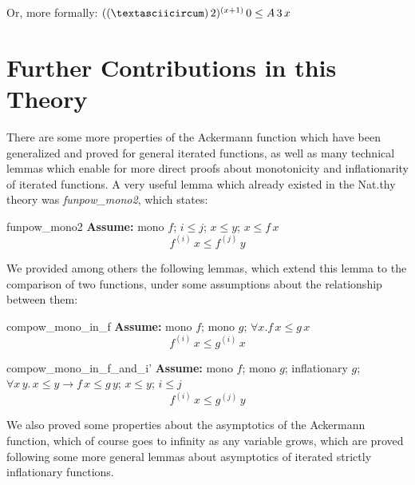\documentclass[headsepline,footsepline,footinclude=false,oneside,fontsize=11pt,paper=a4,listof=totoc,bibliography=totoc]{scrbook} %
\begin{document}
Or, more formally: $((\textasciicircum) \, 2) ^ {(x + 1)} \, 0 \leq A \, 3 \, x$


\section{Further Contributions in this Theory}

There are some more properties of the Ackermann function which have been generalized and proved for
general iterated functions, as well as many technical lemmas which enable for more direct proofs about monotonicity and inflationarity of iterated functions.
A very useful lemma which already existed in the Nat.thy theory was \textit{funpow\_mono2}, which states:
\begin{lemma}{funpow\_mono2} \newline \label{funpow}
	\textbf{Assume:} mono $f$; $i \leq j$; $x \leq y$; $x \leq f \, x$
	\begin{equation}
	f ^{(i)} \, x \leq f ^ {(j)} \, y
	\end{equation}
\end{lemma}

We provided among others the following lemmas, which extend this lemma to the comparison of two functions, under some assumptions about the relationship between them:

\begin{lemma}{compow\_mono\_in\_f} \newline
	\textbf{Assume:} mono $f$; mono $g$; $\forall x. f \, x \leq g \, x$
	\begin{equation}
	f ^{(i)} \, x \leq g ^ {(i)} \, x
	\end{equation}
\end{lemma}

\begin{lemma}{compow\_mono\_in\_f\_and\_i'} \newline
	\textbf{Assume:} mono $f$; mono $g$; inflationary $g$;
	$\forall x\, y.\, x \leq y \rightarrow f\, x \leq g\, y$; $x \leq y$; $i \leq j$
	\begin{equation}
	f ^{(i)} \, x \leq g ^ {(j)} \, y
	\end{equation}
\end{lemma}

We also proved some properties about the asymptotics of the Ackermann function, which of course goes to infinity as any variable grows, which are proved following some more general lemmas about asymptotics of iterated strictly inflationary functions.
\end{document}
